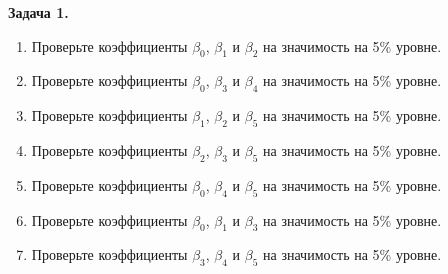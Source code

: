 \documentclass[10pt, a4paper]{extarticle}
\begin{document}
	{\Large \textbf{Задача 1.}}
	
	\begin{enumerate}[label=\alph*)]
		\item Проверьте коэффициенты $\beta_0$, $\beta_1$ и $\beta_2$ на значимость на 5\% уровне.
		\item Проверьте коэффициенты $\beta_0$, $\beta_3$ и $\beta_4$ на значимость на 5\% уровне.
		\item Проверьте коэффициенты $\beta_1$, $\beta_2$ и $\beta_5$ на значимость на 5\% уровне.
		\item Проверьте коэффициенты $\beta_2$, $\beta_3$ и $\beta_5$ на значимость на 5\% уровне.
		\item Проверьте коэффициенты $\beta_0$, $\beta_4$ и $\beta_5$ на значимость на 5\% уровне.
		\item Проверьте коэффициенты $\beta_0$, $\beta_1$ и $\beta_3$ на значимость на 5\% уровне.
		\item Проверьте коэффициенты $\beta_3$, $\beta_4$ и $\beta_5$ на значимость на 5\% уровне.
	\end{enumerate}
	\vspace{1em}
		
\end{document}
